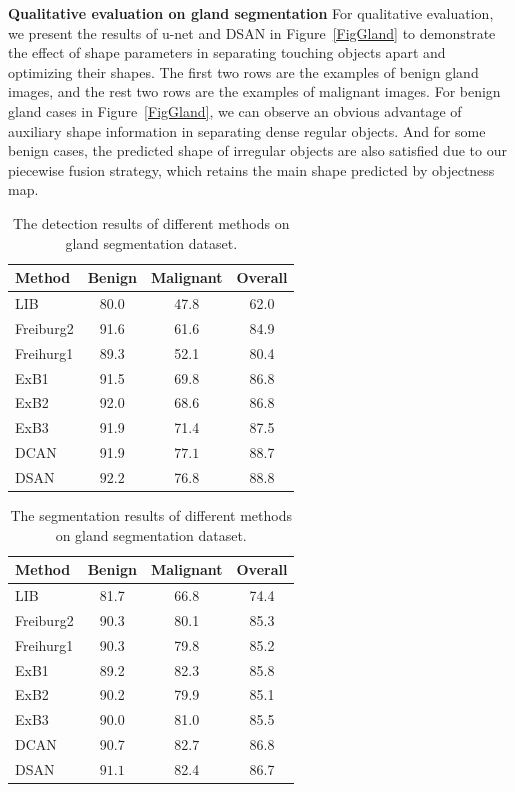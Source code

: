 \textbf{Qualitative evaluation on gland segmentation}
For qualitative evaluation, we present the results of u-net and DSAN in Figure~\ref{FigGland} to demonstrate the effect of shape parameters in separating touching objects apart and optimizing their shapes.
The first two rows are the examples of benign gland images, and the rest two rows are the examples of malignant images.
For benign gland cases in Figure~\ref{FigGland}, we can observe an obvious advantage of auxiliary shape information in separating dense regular objects.
And for some benign cases, the predicted shape of irregular objects are also satisfied due to our piecewise fusion strategy, which retains the main shape predicted by objectness map.

\begin{table}
\begin{center}
\begin{tabular}{l|ccc}
\hline
		Method &Benign & Malignant&Overall \\
		\hline
        LIB & 80.0&47.8&62.0\\
		Freiburg2 & 91.6 & 61.6&84.9 \\
        Freihurg1 &89.3&52.1&80.4\\		
        ExB1 & 91.5 & 69.8 &86.8\\
        ExB2 & 92.0 & 68.6 &86.8\\
        ExB3 & 91.9&71.4&87.5\\
		DCAN & 91.9 & $\mathbf{77.1}$& 88.7\\
		DSAN & $\mathbf{92.2}$ & 76.8&$\mathbf{88.8}$ \\
		\hline
\end{tabular}
\end{center}
\caption{The detection results of different methods on gland segmentation dataset.}
\label{tab:gland-det}
\end{table}

\begin{table}
\begin{center}
\begin{tabular}{l|ccc}
\hline
		Method &Benign & Malignant&Overall \\
		\hline
        LIB & 81.7&66.8&74.4\\
		Freiburg2 & 90.3 & 80.1&85.3 \\
        Freihurg1 &90.3&79.8&85.2\\	
        ExB1 & 89.2 & 82.3 & 85.8\\	
        ExB2 & 90.2 & 79.9 &85.1\\
        ExB3 & 90.0&81.0&85.5\\
		DCAN & 90.7&$\mathbf{82.7}$&$\mathbf{86.8}$ \\
		DSAN & $\mathbf{91.1}$& 82.4& 86.7 \\
		\hline
\end{tabular}
\end{center}
\caption{The  segmentation results of different methods on gland segmentation dataset.}
\label{tab:gland-seg}
\end{table}

